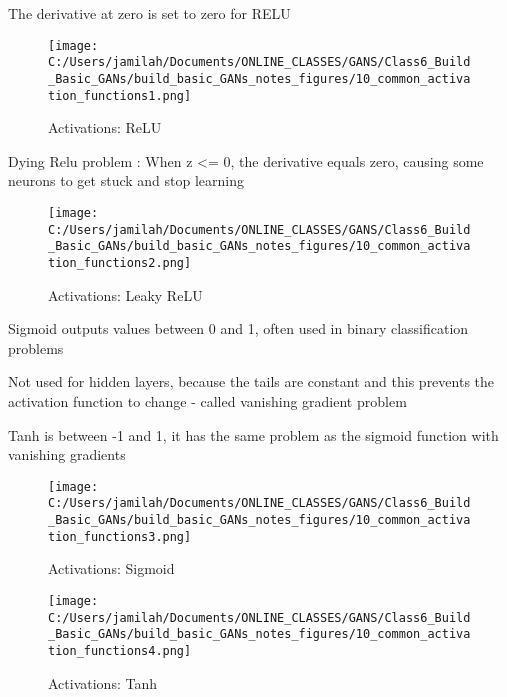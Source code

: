 \documentclass[11pt, onecolumn]{article}
\begin{document}
The derivative at zero is set to zero for RELU
\begin{figure}[htp]
\begin{center}
\texttt{[image: C:/Users/jamilah/Documents/ONLINE\_CLASSES/GANS/Class6\_Build\_Basic\_GANs/build\_basic\_GANs\_notes\_figures/10\_common\_activation\_functions1.png]}
\end{center}
\caption{Activations: ReLU}
\label{10_common_activation_functions1}
\end{figure}

Dying Relu problem : When z <= 0,  the derivative equals zero, causing some neurons to get stuck and stop learning

\begin{figure}[htp]
\begin{center}
\texttt{[image: C:/Users/jamilah/Documents/ONLINE\_CLASSES/GANS/Class6\_Build\_Basic\_GANs/build\_basic\_GANs\_notes\_figures/10\_common\_activation\_functions2.png]}
\end{center}
\caption{Activations: Leaky ReLU}
\label{10_common_activation_functions2}
\end{figure}

Sigmoid outputs values between 0 and 1, often used in binary classification problems

Not used for hidden layers, because the tails are constant and this prevents the activation function to change - called vanishing gradient problem

Tanh is between -1 and 1, it has the same problem as the sigmoid function with vanishing gradients

\begin{figure}[htp]
\begin{center}
\texttt{[image: C:/Users/jamilah/Documents/ONLINE\_CLASSES/GANS/Class6\_Build\_Basic\_GANs/build\_basic\_GANs\_notes\_figures/10\_common\_activation\_functions3.png]}
\end{center}
\caption{Activations: Sigmoid}
\label{10_common_activation_functions3}
\end{figure}

\begin{figure}[htp]
\begin{center}
\texttt{[image: C:/Users/jamilah/Documents/ONLINE\_CLASSES/GANS/Class6\_Build\_Basic\_GANs/build\_basic\_GANs\_notes\_figures/10\_common\_activation\_functions4.png]}
\end{center}
\caption{Activations: Tanh}
\label{10_common_activation_functions4}
\end{figure}
\end{document}
